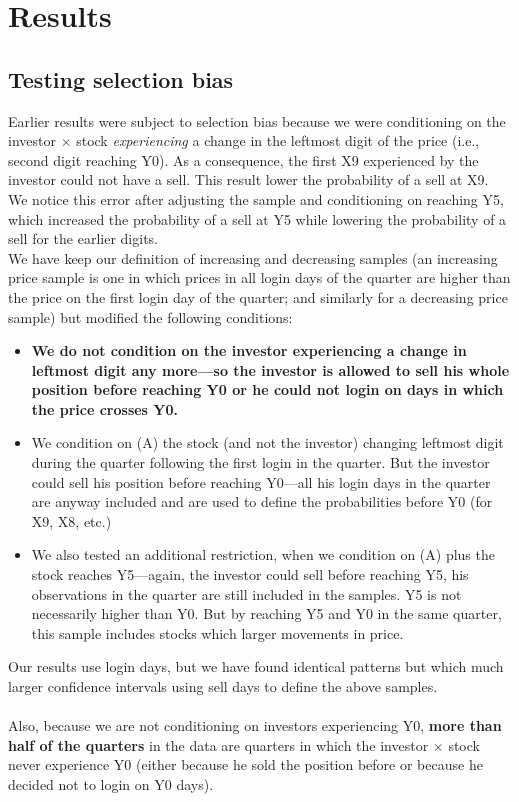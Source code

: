 \documentclass[
	USenglish,12pt,paper=a4,numbers=noenddot,abstract=on,
	final,%
	fullsample,
    ]{scrartcl}
\begin{document}
\section{Results}

\subsection{Testing selection bias}
Earlier results were subject to selection bias because we were conditioning on the investor $\times$ stock \textit{experiencing} a change in the leftmost digit of the price (i.e., second digit reaching Y0). As a consequence, the first X9 experienced by the investor could not have a sell. This result lower the probability of a sell at X9. We notice this error after adjusting the sample and conditioning on reaching Y5, which increased the probability of a sell at Y5 while lowering the probability of a sell for the earlier digits. \\
We have keep our definition of increasing and decreasing samples (an increasing price sample is one in which prices in all login days of the quarter are higher than the price on the first login day of the quarter; and similarly for a decreasing price sample) but modified the following conditions: 
\begin{itemize}
\item \textbf{We do not condition on the investor experiencing a change in leftmost digit any more---so the investor is allowed to sell his whole position before reaching Y0 or he could not login on days in which the price crosses Y0.}
\item We condition on (A) the stock (and not the investor) changing leftmost digit during the quarter following the first login in the quarter. But the investor could sell his position before reaching Y0---all his login days in the quarter are anyway included and are used to define the probabilities before Y0 (for X9, X8, etc.)
\item We also tested an additional restriction, when we condition on (A) plus the stock reaches Y5---again, the investor could sell before reaching Y5, his observations in the quarter are still included in the samples. Y5 is not necessarily higher than Y0. But by reaching Y5 and Y0 in the same quarter, this sample includes stocks which larger movements in price.
\end{itemize}

Our results use login days, but we have found identical patterns but which much larger confidence intervals using sell days to define the above samples. \\ \\
Also, because we are not conditioning on investors experiencing Y0,\textbf{ more than half of the quarters} in the data are quarters in which the investor $\times$ stock never experience Y0 (either because he sold the position before or because he decided not to login on Y0 days).
\end{document}
